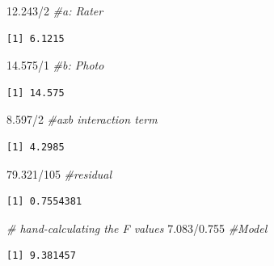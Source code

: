 \documentclass[
  11pt,
]{book}
\newenvironment{Shaded}{\begin{snugshade}}{\end{snugshade}}
\newcommand{\CommentTok}[1]{\textcolor[rgb]{0.56,0.35,0.01}{\textit{#1}}}
\newcommand{\DecValTok}[1]{\textcolor[rgb]{0.00,0.00,0.81}{#1}}
\newcommand{\FloatTok}[1]{\textcolor[rgb]{0.00,0.00,0.81}{#1}}
\newcommand{\SpecialCharTok}[1]{\textcolor[rgb]{0.00,0.00,0.00}{#1}}
\begin{document}
\begin{Shaded}
\begin{Highlighting}[]
\FloatTok{12.243}\SpecialCharTok{/}\DecValTok{2}  \CommentTok{\#a: Rater}
\end{Highlighting}
\end{Shaded}

\begin{verbatim}
[1] 6.1215
\end{verbatim}

\begin{Shaded}
\begin{Highlighting}[]
\FloatTok{14.575}\SpecialCharTok{/}\DecValTok{1}  \CommentTok{\#b:  Photo}
\end{Highlighting}
\end{Shaded}

\begin{verbatim}
[1] 14.575
\end{verbatim}

\begin{Shaded}
\begin{Highlighting}[]
\FloatTok{8.597}\SpecialCharTok{/}\DecValTok{2}  \CommentTok{\#axb interaction term}
\end{Highlighting}
\end{Shaded}

\begin{verbatim}
[1] 4.2985
\end{verbatim}

\begin{Shaded}
\begin{Highlighting}[]
\FloatTok{79.321}\SpecialCharTok{/}\DecValTok{105}  \CommentTok{\#residual}
\end{Highlighting}
\end{Shaded}

\begin{verbatim}
[1] 0.7554381
\end{verbatim}

\begin{Shaded}
\begin{Highlighting}[]
\CommentTok{\# hand{-}calculating the F values}
\FloatTok{7.083}\SpecialCharTok{/}\FloatTok{0.755}  \CommentTok{\#Model}
\end{Highlighting}
\end{Shaded}

\begin{verbatim}
[1] 9.381457
\end{verbatim}
\end{document}
